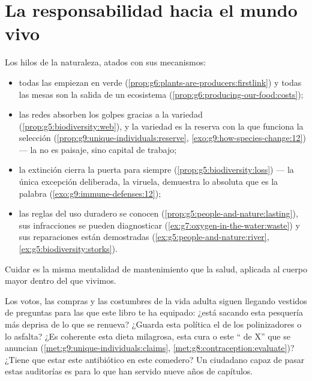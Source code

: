 \section{La responsabilidad hacia el mundo vivo}

\begin{proposition}\label{prop:g9:our-responsibility:stewardship}
Los hilos de la naturaleza, atados con sus mecanismos:
\begin{itemize}
  \item todas las  empiezan en verde
        (\cref{prop:g6:plants-are-producers:firstlink}) y todas las
        mesas son la salida de un ecosistema
        (\cref{prop:g6:producing-our-food:costs});
  \item las redes absorben los golpes gracias a la variedad
        (\cref{prop:g5:biodiversity:web}), y la variedad es la reserva
        con la que funciona la selección
        (\cref{prop:g9:unique-individuals:reserve},
        \cref{exo:g9:how-species-change:12}) --- la  no es
        paisaje, sino capital de trabajo;
  \item la extinción cierra la puerta para siempre
        (\cref{prop:g5:biodiversity:loss}) --- la única excepción
        deliberada, la viruela, demuestra lo absoluta que es la palabra
        (\cref{exo:g9:immune-defenses:12});
  \item las reglas del uso duradero se conocen
        (\cref{prop:g5:people-and-nature:lasting}), sus infracciones se
        pueden diagnosticar
        (\cref{ex:g7:oxygen-in-the-water:waste}) y sus reparaciones
        están demostradas (\cref{ex:g5:people-and-nature:river},
        \cref{ex:g5:biodiversity:storks}).
\end{itemize}
Cuidar es la misma mentalidad de mantenimiento que la salud, aplicada
al cuerpo mayor dentro del que vivimos.
\end{proposition}
\admitted

\begin{example}\label{ex:g9:our-responsibility:citizen}
Los votos, las compras y las costumbres de la vida adulta siguen
llegando vestidos de preguntas para las que este libro te ha equipado:
¿está sacando esta pesquería más deprisa de lo que se renueva? ¿Guarda
esta política el  de los polinizadores o lo asfalta? ¿Es
coherente esta dieta milagrosa, esta cura o este `` de X'' que se
anuncian (\cref{met:g9:unique-individuals:claims},
\cref{met:g8:contraception:evaluate})? ¿Tiene que estar este
antibiótico en este comedero? Un ciudadano capaz de pasar estas
auditorías es para lo que han servido nueve años de capítulos.
\end{example}

